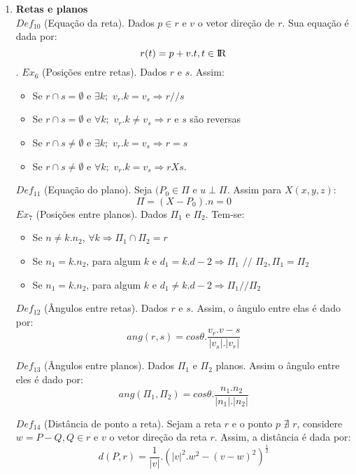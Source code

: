 \documentclass{article}
\begin{document}
\begin{enumerate}
    \item \textbf{Retas e planos}\\
        $Def_{10}$ (Equação da reta). Dados $p \in r$ e $v$ o vetor direção de $r$. Sua equação é dada por: $$ r(t)= p + v.t, t \in {\rm I\!R}$$.
        $Ex_6$ (Posições entre retas). Dados $r$ e $s$. Assim:
        \begin{itemize}
            \item Se  $r \cap s = \emptyset$ e $\exists k;$ $v_r. k = v_s \Rightarrow r//s$
            \item Se  $r \cap s = \emptyset$ e $\forall  k;$ $v_r. k \neq v_s \Rightarrow r$ e $s$ são reversas
            \item Se  $r \cap s \neq \emptyset$ e $\exists  k;$ $v_r. k = v_s \Rightarrow r = s$
            \item Se  $r \cap s \neq \emptyset$ e $\forall  k;$ $v_r. k = v_s \Rightarrow r X s$.
        \end{itemize}
        $Def_{11}$ (Equação do plano). Seja $(P_0 \in \Pi$ e $u \perp \Pi$. Assim para $X(x, y, z)$: $$ \Pi = (X - P_0).n = 0$$
        $Ex_7$ (Posições entre planos). Dados $\Pi _1$ e $\Pi _2$. Tem-se:
        \begin{itemize}
            \item Se $n \neq k.n_2$, $\forall k \Rightarrow \Pi _1 \cap \Pi _2 = r$
            
            \item Se $n_1 = k.n_2$, para algum $k$ e $d_1 = k.d-2 \Rightarrow \Pi _1$ $//$ $\Pi _2, \Pi _1 = \Pi _2$
            
            \item Se $n_1 = k.n_2$, para algum $k$ e $d_1 \neq k.d-2 \Rightarrow \Pi _1 // \Pi _2$
        \end{itemize}
        
        $Def_{12}$ (Ângulos entre retas). Dados $r $ e $s$. Assim, o ângulo entre elas é dado por: $$ ang(r,s) = cos\theta . \frac{v_r . v-s}{|v_s| . |v_r|}$$
        
        $Def_{13}$ (Ângulos entre planos). Dados $\Pi _1$ e $\Pi _2$ planos. Assim o ângulo entre eles é dado por: $$ ang(\Pi _1, \Pi _2)= cos\theta .  \frac{n_1 . n_2}{|n_1| . |n_2|} $$
        
        $Def_{14}$ (Distância de ponto a reta). Sejam a reta $r$ e o ponto $p$ $\nexists$ $r$, considere $w = P - Q, Q \in r$ e $v$ o vetor direção da reta $r$. Assim, a distância é dada por: $$ d(P,r) = \frac{1}{|v|} . (|v|^2 . w^2 - (v - w)^2)^{\frac{1}{2}} $$
        

\end{enumerate}
\end{document}
